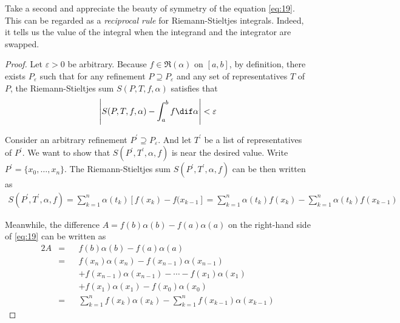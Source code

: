 \documentclass[thmcnt=section, color=blue, 12pt]{my-elegantbook}
\begin{document}
\begin{note}
	Take a second
	and appreciate the beauty of symmetry of the equation \eqref{eq:19}.
	This can be regarded as a \textit{reciprocal rule} for Riemann-Stieltjes integrals.
	Indeed, it tells us the value of the integral
	when the integrand and the integrator are swapped.
\end{note}

\begin{proof}
	Let $\varepsilon > 0$ be arbitrary.
	Because $f \in \mathfrak{R}(\alpha)$ on $[a, b]$, by definition,
	there exists $P_\varepsilon$ such that for
	any refinement $P \supseteq P_\varepsilon$
	and any set of representatives $T$ of $P$,
	the Riemann-Stieltjes sum $S(P, T, f, \alpha)$ satisfies that
	\begin{align*}
		\abs{S(P, T, f, \alpha) - \int_a^b f \dif \alpha} < \varepsilon
	\end{align*}

	Consider an arbitrary refinement $P^\prime \supseteq P_\varepsilon$.
	And let $T^\prime$ be a list of representatives of $P^\prime$.
	We want to show that $S(P^\prime, T^\prime, \alpha, f)$
	is near the desired value.
	Write $P^\prime = \{x_0, \ldots, x_n\}$.
	The Riemann-Stieltjes sum $S(P^\prime, T^\prime, \alpha, f)$ can be then
	written as
	\begin{align}
		S(P^\prime, T^\prime, \alpha, f)
		= \sum_{k=1}^n \alpha(t_k) [f(x_k) - f(x_{k-1}]
		= \sum_{k=1}^n \alpha(t_k) f(x_k)
		- \sum_{k=1}^n \alpha(t_k) f(x_{k-1})
		\label{eq:17}
	\end{align}


	Meanwhile, the difference $A = f(b)\alpha(b) - f(a)\alpha(a)$
	on the right-hand side of \eqref{eq:19}
	can be written as
	\begin{alignat}{2}
		A & = &  & f(b)\alpha(b) - f(a)\alpha(a) \nonumber                                 \\
		  & = &  & f(x_n)\alpha(x_n)
		- f(x_{n-1})\alpha(x_{n-1}) \nonumber                                              \\
		  &   &  & + f(x_{n-1})\alpha(x_{n-1})
		- \cdots
		- f(x_{1})\alpha(x_{1}) \nonumber                                                  \\
		  &   &  & + f(x_{1})\alpha(x_{1})- f(x_0)\alpha(x_0) \nonumber                    \\
		  & = &  & \sum_{k=1}^n f(x_k)\alpha(x_k) - \sum_{k=1}^n f(x_{k-1})\alpha(x_{k-1})
		\label{eq:18}
	\end{alignat}


\end{proof}
\end{document}
